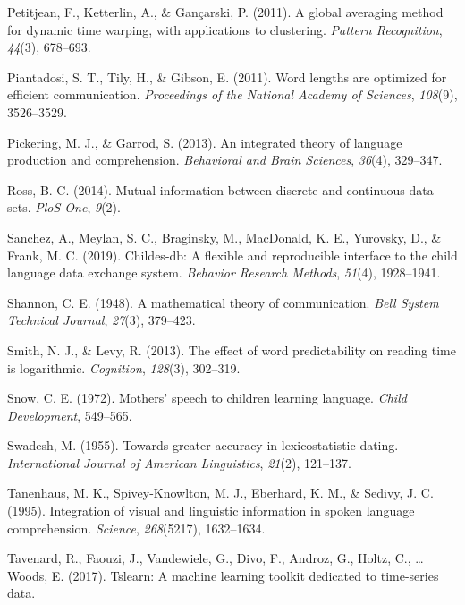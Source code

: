 \documentclass[man,floatsintext]{apa6}
\begin{document}
\leavevmode\hypertarget{ref-petitjean2011}{}%
Petitjean, F., Ketterlin, A., \& Gançarski, P. (2011). A global averaging method for dynamic time warping, with applications to clustering. \emph{Pattern Recognition}, \emph{44}(3), 678--693.

\leavevmode\hypertarget{ref-piantadosi2011}{}%
Piantadosi, S. T., Tily, H., \& Gibson, E. (2011). Word lengths are optimized for efficient communication. \emph{Proceedings of the National Academy of Sciences}, \emph{108}(9), 3526--3529.

\leavevmode\hypertarget{ref-pickering2013}{}%
Pickering, M. J., \& Garrod, S. (2013). An integrated theory of language production and comprehension. \emph{Behavioral and Brain Sciences}, \emph{36}(4), 329--347.

\leavevmode\hypertarget{ref-ross2014}{}%
Ross, B. C. (2014). Mutual information between discrete and continuous data sets. \emph{PloS One}, \emph{9}(2).

\leavevmode\hypertarget{ref-sanchez2019}{}%
Sanchez, A., Meylan, S. C., Braginsky, M., MacDonald, K. E., Yurovsky, D., \& Frank, M. C. (2019). Childes-db: A flexible and reproducible interface to the child language data exchange system. \emph{Behavior Research Methods}, \emph{51}(4), 1928--1941.

\leavevmode\hypertarget{ref-shannon1948}{}%
Shannon, C. E. (1948). A mathematical theory of communication. \emph{Bell System Technical Journal}, \emph{27}(3), 379--423.

\leavevmode\hypertarget{ref-smith2013}{}%
Smith, N. J., \& Levy, R. (2013). The effect of word predictability on reading time is logarithmic. \emph{Cognition}, \emph{128}(3), 302--319.

\leavevmode\hypertarget{ref-snow1972}{}%
Snow, C. E. (1972). Mothers' speech to children learning language. \emph{Child Development}, 549--565.

\leavevmode\hypertarget{ref-swadesh1955}{}%
Swadesh, M. (1955). Towards greater accuracy in lexicostatistic dating. \emph{International Journal of American Linguistics}, \emph{21}(2), 121--137.

\leavevmode\hypertarget{ref-tanenhaus1995}{}%
Tanenhaus, M. K., Spivey-Knowlton, M. J., Eberhard, K. M., \& Sedivy, J. C. (1995). Integration of visual and linguistic information in spoken language comprehension. \emph{Science}, \emph{268}(5217), 1632--1634.

\leavevmode\hypertarget{ref-tslearn}{}%
Tavenard, R., Faouzi, J., Vandewiele, G., Divo, F., Androz, G., Holtz, C., \ldots{} Woods, E. (2017). Tslearn: A machine learning toolkit dedicated to time-series data.
\end{document}
